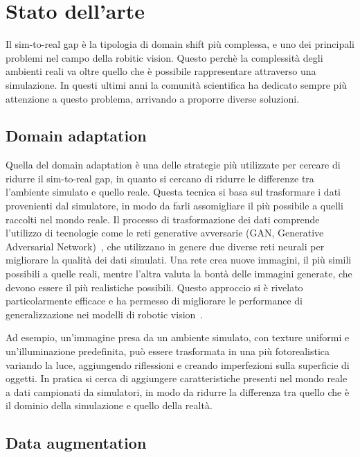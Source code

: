\documentclass[12pt]{report}
\begin{document}
\chapter{Stato dell'arte}
\label{chap:stato_arte}

Il sim-to-real gap è la tipologia di domain shift più complessa, e uno dei principali problemi nel campo della robitic vision. Questo perchè la complessità degli ambienti reali va oltre quello che è possibile rappresentare attraverso una simulazione. In questi ultimi anni la comunità scientifica ha dedicato sempre più attenzione a questo problema, arrivando a proporre diverse soluzioni.

\section{Domain adaptation}
\label{sec:adaptation}

Quella del domain adaptation è una delle strategie più utilizzate per cercare di ridurre il sim-to-real gap, in quanto si cercano di ridurre le differenze tra l'ambiente simulato e quello reale. Questa tecnica si basa sul trasformare i dati provenienti dal simulatore, in modo da farli assomigliare il più possibile a quelli raccolti nel mondo reale. Il processo di trasformazione dei dati comprende l'utilizzo di tecnologie come le reti generative avversarie (GAN, Generative Adversarial Network)~\cite{10.1145/3422622}, che utilizzano in genere due diverse reti neurali per migliorare la qualità dei dati simulati. Una rete crea nuove immagini, il più simili possibili a quelle reali, mentre l'altra valuta la bontà delle immagini generate, che devono essere il più realistiche possibili. Questo approccio si è rivelato particolarmente efficace e ha permesso di migliorare le performance di generalizzazione nei modelli di robotic vision~\cite{Shrivastava_2017_CVPR}.

Ad esempio, un'immagine presa da un ambiente simulato, con texture uniformi e un'illuminazione predefinita, può essere trasformata in una più fotorealistica variando la luce, aggiungendo riflessioni e creando imperfezioni sulla superficie di oggetti. In pratica si cerca di aggiungere caratteristiche presenti nel mondo reale a dati campionati da simulatori, in modo da ridurre la differenza tra quello che è il dominio della simulazione e quello della realtà.

\section{Data augmentation}
\label{sec:augmentation}
\end{document}
